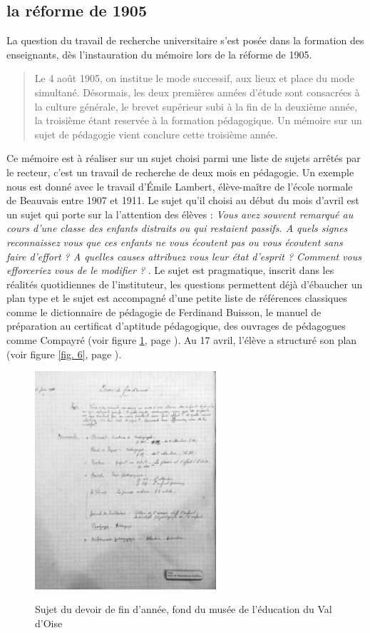 \documentclass[a4paper,11pt]{article}
\begin{document}
			\subsection{la réforme de 1905}
			La question du travail de recherche universitaire s'est posée dans la formation des enseignants, dès l'instauration du mémoire lors de la réforme de 1905.
			\begin{quote}
			Le 4 août 1905, on institue le mode successif, aux lieux et place du mode simultané. Désormais, les deux premières années d'étude sont consacrées à la culture générale, le brevet supérieur subi à la fin de la deuxième année, la troisième étant reservée à la formation pédagogique. Un mémoire sur un sujet de pédagogie vient conclure cette troisième année.
			\end{quote}
			Ce mémoire est à réaliser sur un sujet choisi parmi une liste de sujets arrêtés par le recteur, c'est un travail de recherche de deux mois en pédagogie. Un exemple nous est donné avec le travail d'Émile Lambert, élève-maître de l'école normale de Beauvais entre 1907 et 1911. Le sujet qu'il choisi au début du mois d'avril est un sujet qui porte sur la l'attention des élèves : \emph{Vous avez souvent remarqué au cours d'une classe des enfants distraits ou qui restaient passifs. A quels signes reconnaissez vous que ces enfants ne vous écoutent pas ou vous écoutent sans faire d'effort ? A quelles causes attribuez vous leur état d'esprit ? Comment vous efforceriez vous de le modifier ?} . Le sujet est pragmatique, inscrit dans les réalités quotidiennes de l'instituteur, les questions permettent déjà d'ébaucher un plan type et le sujet est accompagné d'une petite liste de références classiques comme le dictionnaire de pédagogie de Ferdinand Buisson, le manuel de préparation au certificat d'aptitude pédagogique, des ouvrages de pédagogues comme Compayré (voir figure \ref{fig. 5}, page \pageref{fig. 5}). Au 17 avril, l'élève a structuré son plan (voir figure \ref{fig. 6}, page \pageref{fig. 6}).
			\begin{figure}[!h]
			    \centering
			    \includegraphics[width=0.6\textwidth]{sujet.png}\\
			    \caption{Sujet du devoir de fin d'année, fond du musée de l'éducation du Val d'Oise}
			    \label{fig. 5}
			  \end{figure}
			
\end{document}
